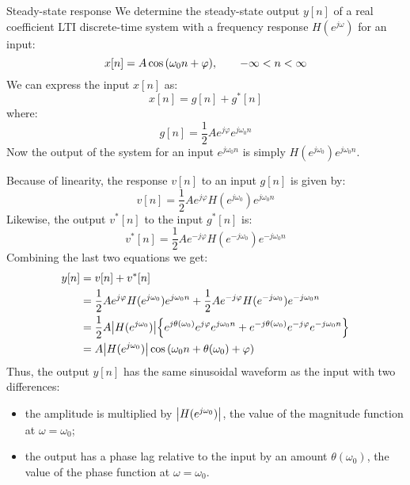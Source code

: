 \documentclass[../../main/main.tex]{subfiles}
\begin{document}
\begin{example}{Steady-state response}{}
    We determine the steady-state output \( y[n] \) of a real coefficient LTI discrete-time system with a frequency response \( H(e^{j\omega}) \) for an input:
    \begin{equation}
        x[n]
        =
        A \cos\qty(\omega_{0}n + \varphi),
        \qquad
        -\infty < n < \infty
        \label{eq:L09_S43_1}
    \end{equation}
    We can express the input \( x[n] \) as:
    \begin{equation}
        x[n]
        =
        g[n] + g^*[n]
        \label{eq:L09_S44_1}
    \end{equation}
    where:
    \begin{equation}
        g[n]
        =
        \frac{1}{2} A e^{j \varphi} e^{j \omega_{0}n}
        \label{eq:L09_S44_2}
    \end{equation}
    Now the output of the system for an input \( e^{j \omega_{0}n} \) is simply \( H(e^{j\omega_{0}}) e^{j\omega_{0}n} \).

    Because of linearity, the response \( v[n] \) to an input \( g[n] \) is given by:
    \begin{equation}
        v[n]
        =
        \frac{1}{2} A e^{j \varphi} H(e^{j \omega_{0}}) e^{j\omega_{0}n}
        \label{eq:L09_S45_1}
    \end{equation}
    Likewise, the output \( v^*[n] \) to the input \( g^*[n] \) is:
    \begin{equation}
        v^*[n]
        =
        \frac{1}{2} A e^{-j \varphi} H(e^{-j \omega_{0}}) e^{-j\omega_{0}n}
        \label{eq:L09_S45_2}
    \end{equation}
    Combining the last two equations we get:
    \begin{align}
        y[n]
        &=
            v[n] + v^{*}[n] \nonumber   \\
        &=
            \frac{1}{2} A e^{j \varphi} H(e^{j \omega_{0}}) e^{j\omega_{0}n} + \frac{1}{2} A e^{-j \varphi} H(e^{-j \omega_{0}}) e^{-j\omega_{0}n}  \nonumber   \\
        &=
            \frac{1}{2} A \abs{H(e^{j \omega_{0}})} \qty{e^{j \theta(\omega_{0})} e^{j \varphi} e^{j \omega_{0}n} + e^{-j \theta(\omega_{0})} e^{-j \varphi} e^{-j \omega_{0}n}}    \nonumber   \\
        &=
            A \abs{H(e^{j \omega_{0}})} \cos\qty(\omega_{0}n + \theta(\omega_{0}) + \varphi)
    \end{align}
    Thus, the output \( y[n] \) has the same sinusoidal waveform as the input with two differences:
    \begin{itemize}
        \item the amplitude is multiplied by \( \abs{H(e^{j \omega_{0}})} \), the value of the magnitude function at \( \omega = \omega_{0} \);
        \item the output has a phase lag relative to the input by an amount \( \theta(\omega_{0}) \), the value of the phase function at \( \omega = \omega_{0} \).
    \end{itemize}
\end{example}
\end{document}
